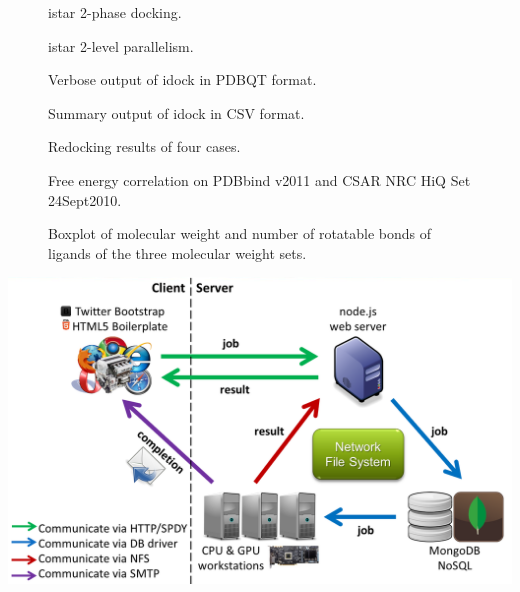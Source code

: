 \documentclass[12pt]{article}
\begin{document}
\begin{figure}
\caption{\label{2PhaseDocking} istar 2-phase docking.}
\end{figure}

\begin{figure}
\caption{\label{2LevelParallelism} istar 2-level parallelism.}
\end{figure}

\begin{figure}
\caption{\label{OutputPDBQT} Verbose output of idock in PDBQT format.}
\end{figure}

\begin{figure}
\caption{\label{OutputCSV} Summary output of idock in CSV format.}
\end{figure}

\begin{figure}
\caption{\label{Redocking} Redocking results of four cases.}
\end{figure}

\begin{figure}
\caption{\label{FECorrelation} Free energy correlation on PDBbind v2011 and CSAR NRC HiQ Set 24Sept2010.}
\end{figure}

\begin{figure}
\caption{\label{MWT-NRB} Boxplot of molecular weight and number of rotatable bonds of ligands of the three molecular weight sets.}
\end{figure}





\clearpage

\begin{center}
\includegraphics[width=\linewidth,keepaspectratio=true]{Architecture.png}
\end{center}
\end{document}
